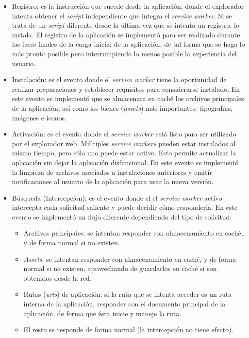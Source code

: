 \begin{itemize}
  \item Registro: es la instrucción que sucede desde la aplicación, donde el explorador intenta obtener el \textit{script} independiente que integra el \textit{service worker}. Si se trata de un \textit{script} diferente desde la última vez que se intenta un registro, lo instala. El registro de la aplicación se implementó para ser realizado durante las fases finales de la carga inicial de la aplicación, de tal forma que se haga lo más pronto posible pero interrumpiendo lo menos posible la experiencia del usuario.

  \item Instalación: es el evento donde el \textit{service worker} tiene la oportunidad de realizar preparaciones y establecer requisitos para considerarse instalado. En este evento se implementó que se almacenara en caché los archivos principales de la aplicación, así como los bienes (\textit{assets}) más importantes: tipografías, imágenes e íconos.

  \item Activación: es el evento donde el \textit{service worker} está listo para ser utilizado por el explorador web. Múltiples \textit{service workers} pueden estar instalados al mismo tiempo, pero sólo uno puede estar activo. Esto permite actualizar la aplicación sin dejar la aplicación disfuncional. En este evento se implementó la limpieza de archivos asociados a instalaciones anteriores y emitir notificaciones al usuario de la aplicación para usar la nueva versión.

  \item{
    Búsqueda (Intercepción): es el evento donde el el \textit{service worker} activo intercepta cada solicitud saliente y puede decidir cómo responderla. En este evento se implementó un flujo diferente dependiendo del tipo de solicitud:

    \begin{itemize}
      \item Archivos principales: se intentan responder con almacenamiento en caché, y de forma normal si no existen.
      \item \textit{Assets}: se intentan responder con almacenamiento en caché, y de forma normal si no existen, aprovechando de guardarlos en caché si son obtenidos desde la red.
      \item Rutas (\textit{urls}) de aplicación: si la ruta que se intenta acceder es un ruta interna de la aplicación, responder con el documento principal de la aplicación, de forma que ésta inicie y maneje la ruta.
      \item El resto se responde de forma normal (la intercepción no tiene efecto).
    \end{itemize}
  }
\end{itemize}


